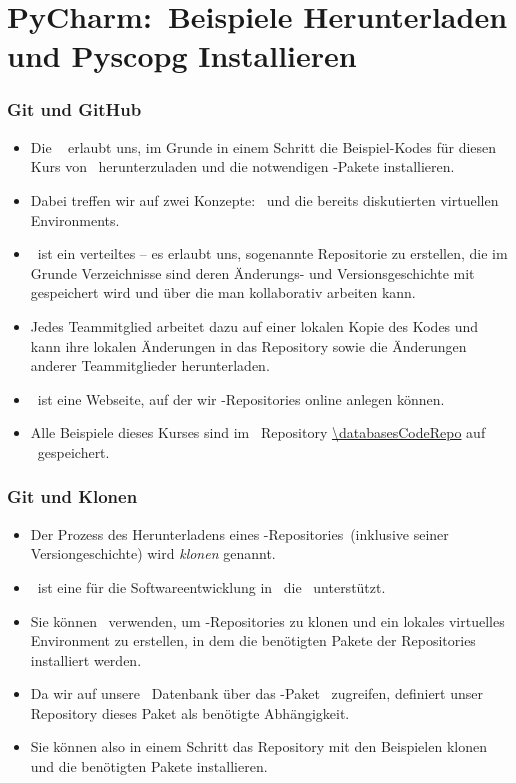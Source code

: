 \documentclass[aspectratio=169,mathserif,notheorems]{beamer}%
\begin{document}
\section{PyCharm:~Beispiele Herunterladen und Pyscopg Installieren}%
%
\begin{frame}%
\frametitle{Git und GitHub}%
\begin{itemize}%
\item Die \pycharm\  erlaubt uns, im Grunde in einem Schritt die Beispiel-Kodes für diesen Kurs von \github\ herunterzuladen und die notwendigen \python-Pakete installieren.%
\item<2-> Dabei treffen wir auf zwei Konzepte: \git\ und die bereits diskutierten virtuellen Environments.%
\item<3-> \git\ ist ein verteiltes  -- es erlaubt uns, sogenannte Repositorie zu erstellen, die im Grunde Verzeichnisse sind deren Änderungs- und Versionsgeschichte mit gespeichert wird und über die man kollaborativ arbeiten kann.%
\item<4-> Jedes Teammitglied arbeitet dazu auf einer lokalen Kopie des Kodes und kann ihre lokalen Änderungen in das Repository  sowie die Änderungen anderer Teammitglieder herunterladen.%
\item<5-> \github\ ist eine Webseite, auf der wir \git-Repositories online anlegen können.%
\item<6-> Alle Beispiele dieses Kurses sind im \git\ Repository \expandafter\url{\databasesCodeRepo} auf \github\ gespeichert.%
\end{itemize}%
\end{frame}%
%
\begin{frame}%
\frametitle{Git und Klonen}%
\begin{itemize}%
\item Der Prozess des Herunterladens eines \git-Repositories~(inklusive seiner Versiongeschichte) wird \emph{klonen} genannt.%
\item<2-> \pycharm\ ist eine  für die Softwareentwicklung in \python\ die \git\ unterstützt.%
\item<3-> Sie können \pycharm\ verwenden, um \git-Repositories zu klonen und ein lokales virtuelles Environment zu erstellen, in dem die benötigten Pakete der Repositories installiert werden.%
\item<4-> Da wir auf unsere \postgresql\ Datenbank über das \python-Paket \psycopg\ zugreifen, definiert unser Repository dieses Paket als benötigte Abhängigkeit.%
\item<5-> Sie können also in einem Schritt das Repository mit den Beispielen klonen und die benötigten Pakete installieren.%
\end{itemize}%
\end{frame}%
\end{document}
